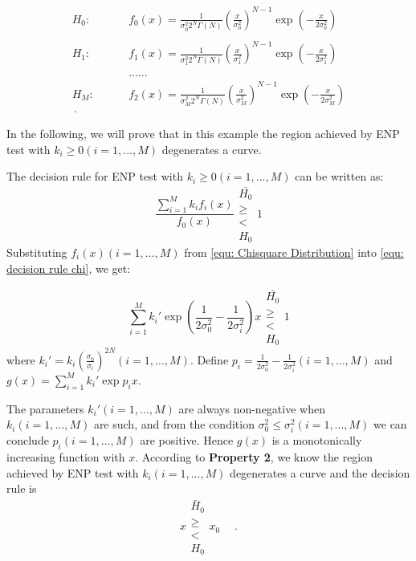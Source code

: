\documentclass[12pt,journal,a4paper,twoside,doublecolumn]{IEEEtran}
\begin{document}
\begin{spacing}{1.0}
\def \CHISQU[#1]{\frac{1}{#1 2^N\Gamma(N)}\left(\frac{x}{#1}\right)^{N-1}\exp\left(-\frac{x}{2#1}\right)\\}
\begin{equation}
  \label{equ: Chisquare Distribution}
  \begin{split}
    H_0:\;\;\;\;\;\;\;\;&f_0(x) = \CHISQU[\sigma_0^2]\\
    H_1:\;\;\;\;\;\;\;\;&f_1(x) = \CHISQU[\sigma_1^2]\\
    &......\\
    H_M:\;\;\;\;\;\;\;\;&f_2(x) = \CHISQU[\sigma_M^2]\,.
  \end{split}
\end{equation}

In the following, we will prove that in this example the region achieved by ENP test with $k_i \geq 0 (i = 1, ..., M)$ degenerates a curve.

The decision rule for ENP test with $k_i \geq 0 (i=1, ..., M)$ can be written as:
\begin{equation}
\label{equ: decision rule chi}
  \frac{\sum_{i=1}^{M}k_if_i(x)}{f_0(x)} \substack{\bar{H_0} \\ \geq \\ < \\ H_0} 1
\end{equation}
Substituting $f_i(x) (i=1, ..., M)$ from \eqref{equ: Chisquare Distribution} into \eqref{equ: decision rule chi}, we get:

\begin{equation}
  \label{equ: decision rule chi 1}
 \sum_{i=1}^{M}k_i'\exp{(\frac{1}{2\sigma_0^2} - \frac{1}{2\sigma_i^2})x} \substack{\bar{H_0} \\ \geq \\ < \\ H_0} 1
\end{equation}
where $k_i' = k_i(\frac{\sigma_0}{\sigma_i})^{2N} (i= 1, ..., M)$. Define $p_i = \frac{1}{2\sigma_0^2} - \frac{1}{2\sigma_i^2} (i=1, ..., M)$ and $g(x) =  \sum_{i=1}^{M}k_i'\exp{p_ix}$.

The parameters $k_i' (i=1, ..., M)$ are always non-negative when $k_i (i=1, ..., M)$ are such, and from 
 the condition $\sigma_0^2 \leq \sigma_i^2 (i=1, ..., M)$ we can conclude $p_i (i=1, ..., M)$ are positive. Hence $g(x)$ is a monotonically increasing function with $x$. According to \textbf{Property 2}, we know the region achieved by ENP test with $k_i (i = 1, ..., M)$ degenerates a curve and the decision rule is
\begin{equation}
  \label{equ: decision rule chi 2}
  x \substack{\bar{H}_0 \\ \geq \\ < \\ H_0} x_0\;\;\;\;\,.
\end{equation}


\end{spacing}
\end{document}
